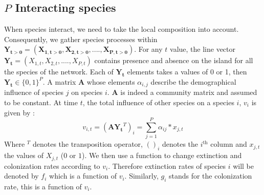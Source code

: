 \subsection{$P$ Interacting species}

When species interact, we need to take the local composition into account. Consequently, we gather species processes within $\mathbf{Y_{t>0}}=(\mathbf{X_{1,t>0}}, \mathbf{X_{2,t>0}}, ...., \mathbf{X_{P,t>0}})$. For any $t$ value, the line vector $\mathbf{\mathbf{Y_t}}=(X_{1,t}, X_{2,t}, ...., X_{P,t})$ contains presence and absence on the island for all the species of the network. Each of $\mathbf{\mathbf{Y_t}}$ elements takes a values of 0 or 1, then $\mathbf{\mathbf{Y_t}}\in \{0,1\}^P$. A matrix $\mathbf{A}$ whose elements $\alpha_{i,j}$ describe the demographical influence of species $j$ on species $i$. $\mathbf{A}$ is indeed a community matrix and assumed to be constant. At time $t$, the total influence of other species on a species $i$, $v_i$ is given by :
\begin{equation}
 \label{eq7} v_{i,t}=(\mathbf{A}\mathbf{\mathbf{Y_t}}^T)_i=\sum_{j=1}^P\alpha_{ij}*x_{j,t}
\end{equation}
Where $^T$ denotes the transposition operator, $()_i$ denotes the $i^{\text{th}}$ column and $x_{j,t}$ the values of $X_{j,t}$ ($0$ or $1$). We then use a function to change extinction and colonization rates according to $v_i$. Therefore extinction rates of species $i$ will be denoted by $f_i$ which is a function of $v_i$. Similarly, $g_i$ stands for the colonization rate, this is a function of $v_i$.

